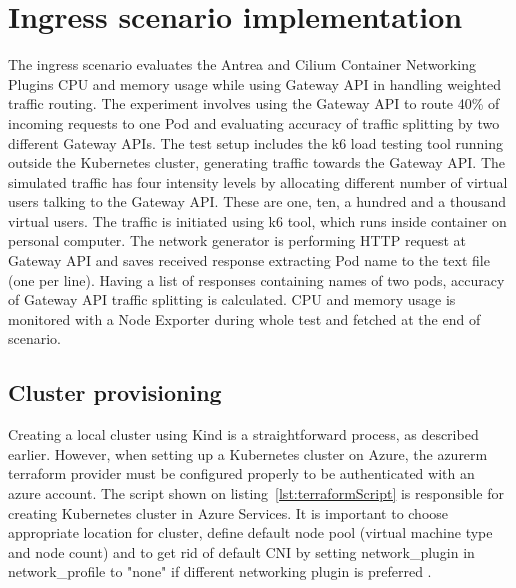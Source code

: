\section{Ingress scenario implementation}
\label{sec:ingressImpl}

The ingress scenario evaluates the Antrea and Cilium Container Networking Plugins CPU and memory usage while using Gateway API in handling weighted traffic routing. The experiment involves using the Gateway API to route 40\% of incoming requests to one Pod and evaluating accuracy of traffic splitting by two different Gateway APIs. The test setup includes the k6 load testing tool running outside the Kubernetes cluster, generating traffic towards the Gateway API. The simulated traffic has four intensity levels by allocating different number of virtual users talking to the Gateway API. These are one, ten, a hundred and a thousand virtual users. The traffic is initiated using k6 tool, which runs inside container on personal computer. The network generator is performing HTTP request at Gateway API and saves received response extracting Pod name to the text file (one per line). Having a list of responses containing names of two pods, accuracy of Gateway API traffic splitting is calculated. CPU and memory usage is monitored with a Node Exporter during whole test and fetched at the end of scenario.


\subsection{Cluster provisioning}
\label{sec:clusterProvisioning}

Creating a local cluster using Kind is a straightforward process, as described earlier. However, when setting up a Kubernetes cluster on Azure, the azurerm terraform provider must be configured properly to be authenticated with an azure account. The script shown on listing~\ref{lst:terraformScript} is responsible for creating Kubernetes cluster in Azure Services. It is important to choose appropriate location for cluster, define default node pool (virtual machine type and node count) and to get rid of default CNI by setting network\_plugin in network\_profile to "none" if different networking plugin is preferred \cite{AKS}.

